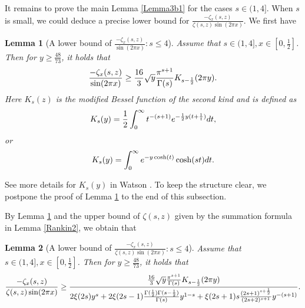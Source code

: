\documentclass[reqno,english]{amsart}
\newtheorem{lemma}{Lemma}[section]
\newtheorem{open problem}{Open Problem}[section]
\newtheorem{open question}{Open Question}[section]
\newtheorem{open questions on hexagonal lattice}{Open Questions on hexagonal lattice}[section]
\begin{document}
It remains to prove the main Lemma \ref{Lemma3b1} for the cases $s\in(1,4]$. When $s$ is small, we could deduce a
precise lower bound for $\frac{-\zeta_x(s,z)}{\zeta(s,z)\sin(2\pi x)}$. We first have
\begin{lemma}[A lower bound of $\frac{-\zeta_x(s,z)}{\sin(2\pi x)}: s\leq4$]\label{Lemma4.11}
Assume that $s\in(1,4], x\in[0,\frac{1}{2}]$. Then for $y\geq\frac{48}{73}$, it holds that
 \begin{equation}\aligned\nonumber
\frac{-\zeta_x(s,z)}{\sin(2\pi x)}\geq\frac{16}{3}\sqrt{y}\frac{\pi^{s+1}}{\Gamma(s)}K_{s-\frac{1}{2}}(2\pi y)
.
\endaligned\end{equation}
Here $K_s(z)$ is the modified Bessel function of the second kind and is defined as
 \begin{equation}\aligned\nonumber
K_{s}(y)=\frac{1}{2}\int_0^\infty  t^{-(s+1)}e^{-\frac{1}{2}y(t+\frac{1}{t})}dt,
\endaligned\end{equation}
or
 \begin{equation}\aligned\label{Ks}
K_{s}(y)=\int_0^\infty  e^{-y\cosh(t)}\cosh(st)dt.
\endaligned\end{equation}
\end{lemma}
See more details for $K_s(y)$ in Watson \cite{Watson1995}. To keep the structure clear,
we postpone the proof of Lemma \ref{Lemma4.11} to the end of this subsection.

By Lemma \ref{Lemma4.11} and the upper bound of $\zeta(s,z)$ given by the summation formula in Lemma \ref{Rankin2}, we obtain that
\begin{lemma}[A lower bound of $\frac{-\zeta_x(s,z)}{\zeta(s,z)\sin(2\pi x)}: s\leq4$] \label{Lemma412KKK}
Assume that $s\in(1,4], x\in[0,\frac{1}{2}]$. Then for $y\geq\frac{48}{73}$, it holds that
 \begin{equation}\aligned\nonumber
\frac{-\zeta_x(s,z)}{\zeta(s,z)\sin(2\pi x)}\geq\frac{\frac{16}{3}\sqrt{y}\frac{\pi^{s+1}}{\Gamma(s)}K_{s-\frac{1}{2}}(2\pi y)}
{2\xi(2s)y^s+
2\xi(2s-1)\frac{\Gamma(\frac{1}{2})\Gamma(s-\frac{1}{2})}{\Gamma(s)}y^{1-s}
+\xi(2s+1)s\frac{(2s+1)^{s+\frac{1}{2}}}{(2s+2)^{s+1}}y^{-(s+1)}}.
\endaligned\end{equation}

\end{lemma}
\end{document}
